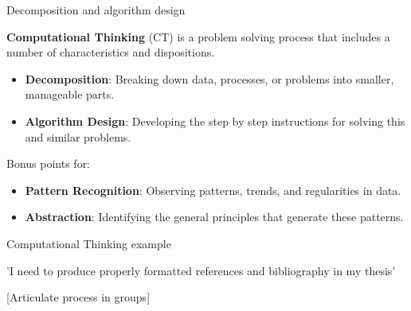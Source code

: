 \documentclass[aspectratio=1610, 11pt]{beamer} %
\begin{document}
\begin{frame}{Decomposition and algorithm design}

\textbf{Computational Thinking }(CT) is a problem solving process that includes a number of characteristics and dispositions. \cite{Google2019-es}
\begin{itemize}[label=\textbullet]
    \item \textbf{Decomposition}: Breaking down data, processes, or problems into smaller, manageable parts.
    \item \textbf{Algorithm Design}: Developing the step by step instructions for solving this and similar problems.
\end{itemize}

Bonus points for:
\begin{itemize}
    \item \textbf{Pattern Recognition}: Observing patterns, trends, and regularities in data.
    \item \textbf{Abstraction}: Identifying the general principles that generate these patterns.
\end{itemize}
\end{frame}

\begin{frame}{Computational Thinking example}

'I need to produce properly formatted references and bibliography in my thesis'

[Articulate process in groups]

\end{frame}



\end{document}
